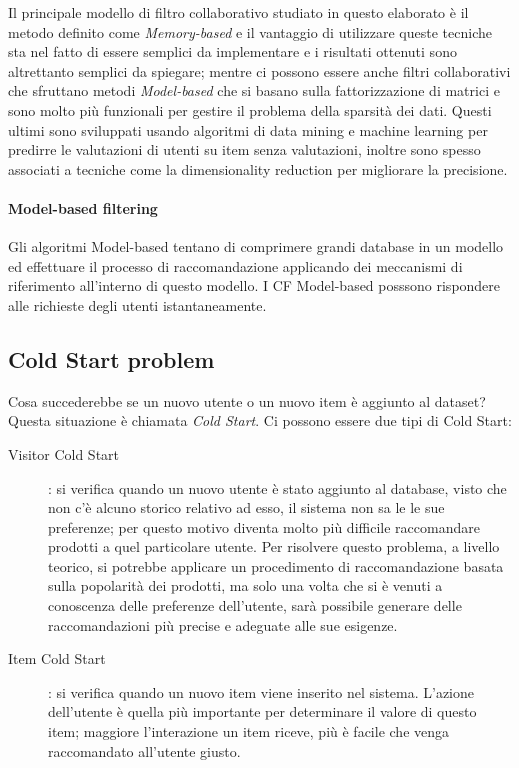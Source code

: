 Il principale modello di filtro collaborativo studiato in questo elaborato è il metodo definito come \textit{Memory-based} e il 
vantaggio di utilizzare queste tecniche sta nel fatto di essere semplici da implementare e i risultati ottenuti sono altrettanto 
semplici da spiegare; mentre ci possono essere anche filtri collaborativi che sfruttano metodi \textit{Model-based} che si basano sulla 
fattorizzazione di matrici e sono molto più funzionali per gestire il problema della sparsità dei dati. Questi ultimi sono sviluppati
usando algoritmi di data mining e machine learning per predirre le valutazioni di utenti su item senza valutazioni, inoltre sono spesso 
associati a tecniche come la dimensionality reduction per migliorare la precisione.


\paragraph{Model-based filtering} 
Gli algoritmi Model-based tentano di comprimere grandi database in un modello ed effettuare il processo di raccomandazione applicando dei
meccanismi di riferimento all'interno di questo modello. 
I CF Model-based posssono rispondere alle richieste degli utenti istantaneamente. \cite{model-based-approach-for-collaborative-filtering}


\subsection{Cold Start problem} 
Cosa succederebbe se un nuovo utente o un nuovo item è aggiunto al dataset? Questa situazione è chiamata \textit{Cold Start}. Ci possono
essere due tipi di Cold Start:
\begin{description}
	\item[Visitor Cold Start]: si verifica quando un nuovo utente è stato aggiunto al database, visto che non c'è alcuno storico relativo ad esso, il sistema non
	sa le le sue preferenze; per questo motivo diventa molto più difficile raccomandare prodotti a quel particolare utente. Per risolvere questo problema,
	a livello teorico, si potrebbe applicare un procedimento di raccomandazione basata sulla popolarità dei prodotti, ma solo una volta che si è venuti a 
	conoscenza delle preferenze dell'utente, sarà possibile generare delle raccomandazioni più precise e adeguate alle sue esigenze.
	\item[Item Cold Start]: si verifica quando un nuovo item viene inserito nel sistema. L'azione dell'utente è quella più importante per determinare
	il valore di questo item; maggiore l'interazione un item riceve, più è facile che venga raccomandato all'utente giusto.  
\end{description}



